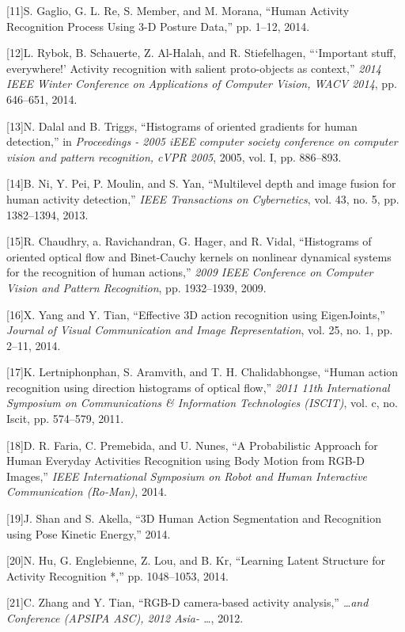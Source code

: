 {[}11{]}S. Gaglio, G. L. Re, S. Member, and M. Morana, ``Human Activity
Recognition Process Using 3-D Posture Data,'' pp. 1--12, 2014.

{[}12{]}L. Rybok, B. Schauerte, Z. Al-Halah, and R. Stiefelhagen,
```Important stuff, everywhere!' Activity recognition with salient
proto-objects as context,'' \emph{2014 IEEE Winter Conference on
Applications of Computer Vision, WACV 2014}, pp. 646--651, 2014.

{[}13{]}N. Dalal and B. Triggs, ``Histograms of oriented gradients for
human detection,'' in \emph{Proceedings - 2005 iEEE computer society
conference on computer vision and pattern recognition, cVPR 2005}, 2005,
vol. I, pp. 886--893.

{[}14{]}B. Ni, Y. Pei, P. Moulin, and S. Yan, ``Multilevel depth and
image fusion for human activity detection,'' \emph{IEEE Transactions on
Cybernetics}, vol. 43, no. 5, pp. 1382--1394, 2013.

{[}15{]}R. Chaudhry, a. Ravichandran, G. Hager, and R. Vidal,
``Histograms of oriented optical flow and Binet-Cauchy kernels on
nonlinear dynamical systems for the recognition of human actions,''
\emph{2009 IEEE Conference on Computer Vision and Pattern Recognition},
pp. 1932--1939, 2009.

{[}16{]}X. Yang and Y. Tian, ``Effective 3D action recognition using
EigenJoints,'' \emph{Journal of Visual Communication and Image
Representation}, vol. 25, no. 1, pp. 2--11, 2014.

{[}17{]}K. Lertniphonphan, S. Aramvith, and T. H. Chalidabhongse,
``Human action recognition using direction histograms of optical flow,''
\emph{2011 11th International Symposium on Communications \& Information
Technologies (ISCIT)}, vol. c, no. Iscit, pp. 574--579, 2011.

{[}18{]}D. R. Faria, C. Premebida, and U. Nunes, ``A Probabilistic
Approach for Human Everyday Activities Recognition using Body Motion
from RGB-D Images,'' \emph{IEEE International Symposium on Robot and
Human Interactive Communication (Ro-Man)}, 2014.

{[}19{]}J. Shan and S. Akella, ``3D Human Action Segmentation and
Recognition using Pose Kinetic Energy,'' 2014.

{[}20{]}N. Hu, G. Englebienne, Z. Lou, and B. Kr, ``Learning Latent
Structure for Activity Recognition *,'' pp. 1048--1053, 2014.

{[}21{]}C. Zhang and Y. Tian, ``RGB-D camera-based activity analysis,''
\emph{\ldots{}and Conference (APSIPA ASC), 2012 Asia- \ldots{}}, 2012.


